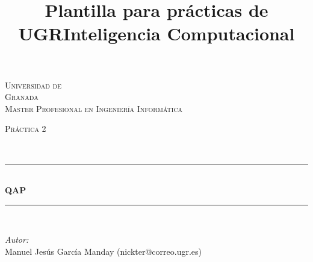 \documentclass[10pt]{article}
\title{Plantilla para prácticas de UGR}
\title{Inteligencia Computacional}
\begin{document}
\begin{center}																		%
\newcommand{\HRule}{\rule{\linewidth}{0.5mm}}									%
\begin{minipage}{0.48\textwidth} \begin{flushleft}
\end{flushleft}\end{minipage}
\begin{minipage}{0.48\textwidth} \begin{flushright}
\end{flushright}\end{minipage}

\vspace*{-1.5cm}								%
\textsc{\huge Universidad de\\ \vspace{5px} Granada}\\[1.5cm]	

\textsc{\LARGE Master Profesional en Ingenier\'ia Inform\'atica }\\[1.5cm]													%

\begin{minipage}{0.9\textwidth} 
\begin{center}																					%
\textsc{\LARGE Pr\'actica 2}
\end{center}
\end{minipage}\\[0.5cm]
 			\vspace*{1cm}																		%
\HRule \\[0.4cm]																	%
{ \huge \bfseries QAP}\\[0.4cm]	%
\HRule \\[1.5cm]																	%
\begin{minipage}{0.46\textwidth}													%
\begin{flushleft} \large															%
\emph{Autor:}\\	
Manuel Jes\'us Garc\'ia Manday (nickter@correo.ugr.es)\\
\end{flushleft}																		%
\end{minipage}		
\begin{minipage}{0.52\textwidth}		
\vspace{-0.6cm}											%
\begin{flushright} \large															%
\end{flushright}																	%
\end{minipage}	
\vspace*{1cm}
 	

\end{center}
\end{document}
